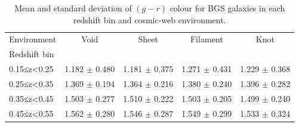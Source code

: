 \begin{table}
\caption{Mean and standard deviation of $(g-r)$ colour for BGS galaxies in each redshift bin and cosmic-web environment.}
\label{tab:bgs_colour_mean_std}
\begin{tabular}{lcccc}
\toprule
Environment & Void & Sheet & Filament & Knot \\
Redshift bin &  &  &  &  \\
\midrule
0.15≤z<0.25 & 1.182 $\pm$ 0.480 & 1.181 $\pm$ 0.375 & 1.271 $\pm$ 0.431 & 1.229 $\pm$ 0.368 \\
0.25≤z<0.35 & 1.369 $\pm$ 0.194 & 1.364 $\pm$ 0.216 & 1.380 $\pm$ 0.240 & 1.396 $\pm$ 0.282 \\
0.35≤z<0.45 & 1.503 $\pm$ 0.277 & 1.510 $\pm$ 0.222 & 1.503 $\pm$ 0.205 & 1.499 $\pm$ 0.240 \\
0.45≤z<0.55 & 1.562 $\pm$ 0.280 & 1.546 $\pm$ 0.287 & 1.549 $\pm$ 0.299 & 1.533 $\pm$ 0.324 \\
\bottomrule
\end{tabular}
\end{table}
